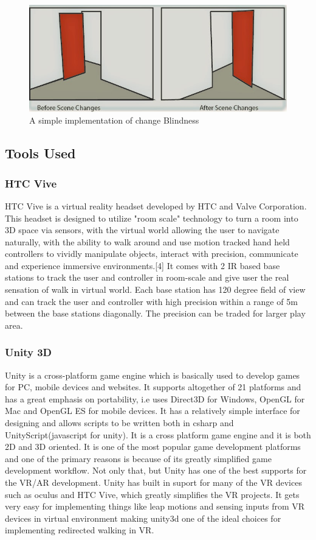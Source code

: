 \documentclass[12pt]{article}
\begin{document}
\begin{figure}[!ht]
\centering
\includegraphics[width = \textwidth]{blindness2}
\caption{A simple implementation of change Blindness}
\end{figure}

\clearpage
\subsection{Tools Used}

\subsubsection{HTC Vive}
 HTC Vive is a virtual reality headset developed by HTC and Valve Corporation. This headset is designed to utilize "room scale" technology to turn a room into 3D space via sensors, with the virtual world allowing the user to navigate naturally, with the ability to walk around and use motion tracked hand held controllers to vividly manipulate objects, interact with precision, communicate and experience immersive environments.[4] It comes with 2 IR based base stations to track the user and controller in room-scale and give user the real sensation of walk in virtual world. Each base station has 120 degree field of view and can track the user and controller with high precision within a range of 5m between the base stations diagonally. The precision can be traded for larger play area.
\subsubsection{Unity 3D}
Unity is a cross-platform game engine which is basically used to develop games for PC, mobile devices and websites. It supports altogether of 21 platforms and has a great emphasis on portability, i.e uses Direct3D for Windows, OpenGL for Mac and OpenGL ES for mobile devices. 
It has a relatively simple interface for designing and allows scripts to be written both in csharp and UnityScript(javascript for unity). It is a cross platform game engine and it is both 2D and 3D oriented. It is one of the most popular game development platforms and one of the primary reasons is because of its greatly simplified game development workflow.
Not only that, but Unity has one of the best supports for the VR/AR development. Unity has built in suport for many of the VR devices such as oculus and HTC Vive, which greatly simplifies the VR projects. It gets very easy for implementing things like leap motions and sensing inputs from VR devices in virtual environment making unity3d one of the ideal choices for implementing redirected walking in VR. 
\end{document}

